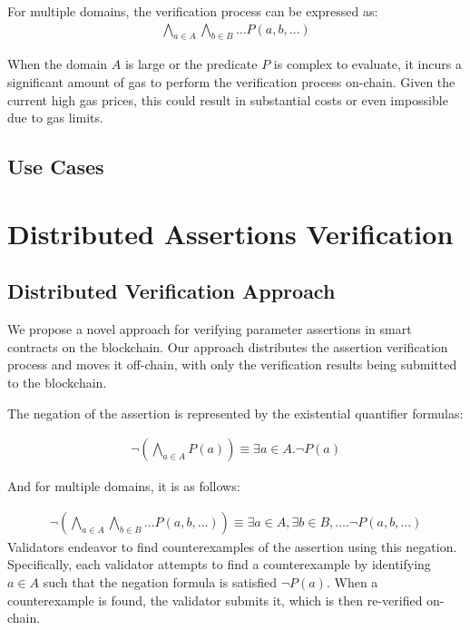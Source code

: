 \documentclass[runningheads]{llncs}
\begin{document}
For multiple domains, the verification process can be expressed as:
\begin{gather}
  \label{eq:4}
  \bigwedge_{a \in A} \bigwedge_{b \in B} \dots P(a, b, \dots)
\end{gather}

When the domain $A$ is large or the predicate $P$ is complex to evaluate, it incurs a significant amount of gas to perform the verification process on-chain.  Given the current high gas prices, this could result in substantial costs or even impossible due to gas limits. 
\subsection{Use Cases}

\section{Distributed Assertions Verification}
\label{sec:distributed-assertion-verification}
\subsection{Distributed Verification Approach}
We propose a novel approach for verifying parameter assertions in smart contracts on the blockchain. Our approach distributes the assertion verification process and moves it off-chain, with only the verification results being submitted to the blockchain.

The negation of the assertion is represented by the existential quantifier formulas:

\begin{gather}
\label{eq:3}
\neg \left( \bigwedge_{a \in A} P(a) \right) \equiv \exists a \in A. \neg P(a)
\end{gather}

And for multiple domains, it is as follows:

\begin{gather}
\label{eq:4}
\neg \left( \bigwedge_{a \in A} \bigwedge_{b \in B} \dots P(a, b, \dots) \right) \equiv \exists a \in A, \exists b \in B, \dots . \neg P(a, b, \dots)
\end{gather}
Validators endeavor to find counterexamples of the assertion using this negation. Specifically, each validator attempts to find a counterexample by identifying $a \in A$ such that the negation formula is satisfied $\neg P(a)$. When a counterexample is found, the validator submits it, which is then re-verified on-chain. 
\end{document}
